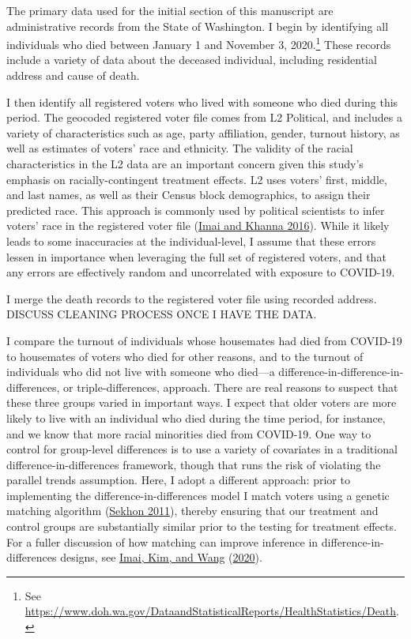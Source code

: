 \documentclass[
  12pt,
]{article}
\begin{document}
The primary data used for the initial section of this manuscript are administrative records from the State of Washington. I begin by identifying all individuals who died between January 1 and November 3, 2020.\footnote{See \url{https://www.doh.wa.gov/DataandStatisticalReports/HealthStatistics/Death}.} These records include a variety of data about the deceased individual, including residential address and cause of death.

I then identify all registered voters who lived with someone who died during this period. The geocoded registered voter file comes from L2 Political, and includes a variety of characteristics such as age, party affiliation, gender, turnout history, as well as estimates of voters' race and ethnicity. The validity of the racial characteristics in the L2 data are an important concern given this study's emphasis on racially-contingent treatment effects. L2 uses voters' first, middle, and last names, as well as their Census block demographics, to assign their predicted race. This approach is commonly used by political scientists to infer voters' race in the registered voter file (\protect\hyperlink{ref-Imai2016}{Imai and Khanna 2016}). While it likely leads to some inaccuracies at the individual-level, I assume that these errors lessen in importance when leveraging the full set of registered voters, and that any errors are effectively random and uncorrelated with exposure to COVID-19.

I merge the death records to the registered voter file using recorded address. DISCUSS CLEANING PROCESS ONCE I HAVE THE DATA.

I compare the turnout of individuals whose housemates had died from COVID-19 to housemates of voters who died for other reasons, and to the turnout of individuals who did not live with someone who died---a difference-in-difference-in-differences, or triple-differences, approach. There are real reasons to suspect that these three groups varied in important ways. I expect that older voters are more likely to live with an individual who died during the time period, for instance, and we know that more racial minorities died from COVID-19. One way to control for group-level differences is to use a variety of covariates in a traditional difference-in-differences framework, though that runs the risk of violating the parallel trends assumption. Here, I adopt a different approach: prior to implementing the difference-in-differences model I match voters using a genetic matching algorithm (\protect\hyperlink{ref-Sekhon2011}{Sekhon 2011}), thereby ensuring that our treatment and control groups are substantially similar prior to the testing for treatment effects. For a fuller discussion of how matching can improve inference in difference-in-differences designs, see \protect\hyperlink{ref-Imai2020}{Imai, Kim, and Wang} (\protect\hyperlink{ref-Imai2020}{2020}).
\end{document}

